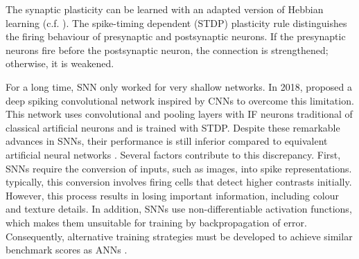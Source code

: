 The synaptic plasticity can be learned with an adapted version of Hebbian learning (c.f. ).
The spike-timing dependent (STDP) plasticity rule  distinguishes the firing behaviour of presynaptic and postsynaptic neurons.
If the presynaptic neurons fire before the postsynaptic neuron, the connection is strengthened; otherwise, it is weakened.

For a long time, SNN only worked for very shallow networks.
In 2018,  proposed a deep spiking convolutional network inspired by CNNs to overcome this limitation.
This network uses convolutional and pooling layers with IF neurons traditional of classical artificial neurons and is trained with STDP.
Despite these remarkable advances in SNNs, their performance is still inferior compared to equivalent artificial neural networks . Several factors contribute to this discrepancy. First, SNNs require the conversion of inputs, such as images, into spike representations.
typically, this conversion involves firing cells that detect higher contrasts initially. 
However, this process results in losing important information, including colour and texture details. In addition, SNNs use non-differentiable activation functions, which makes them unsuitable for training by backpropagation of error. Consequently, alternative training strategies must be developed to achieve similar benchmark scores as ANNs \cite{nunes_spiking_2022}.












